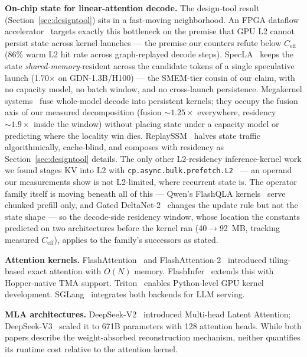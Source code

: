 \documentclass[10pt,twocolumn]{article}
\begin{document}
\textbf{On-chip state for linear-attention decode.}  The design-tool result (Section~\ref{sec:designtool}) sits in a fast-moving neighborhood.  An FPGA dataflow accelerator~\cite{gupta2026persistentstate} targets exactly this bottleneck on the premise that GPU L2 cannot persist state across kernel launches --- the premise our counters refute below $C_\text{eff}$ (86\% warm L2 hit rate across graph-replayed decode steps).  SpecLA~\cite{wang2026specla} keeps the state \emph{shared-memory}-resident across the candidate tokens of a single speculative launch (1.70$\times$ on GDN-1.3B/H100) --- the SMEM-tier cousin of our claim, with no capacity model, no batch window, and no cross-launch persistence.  Megakernel systems~\cite{automegakernel2026} fuse whole-model decode into persistent kernels; they occupy the fusion axis of our measured decomposition (fusion ${\sim}1.25\times$ everywhere, residency ${\sim}1.9\times$ inside the window) without placing state under a capacity model or predicting where the locality win dies.  ReplaySSM~\cite{dao2026replayssm} halves state traffic algorithmically, cache-blind, and composes with residency as Section~\ref{sec:designtool} details.  The only other L2-residency inference-kernel work we found stages KV into L2 with \texttt{cp.async.bulk.prefetch.L2}~\cite{kvprefetch2025} --- an operand our measurements show is not L2-limited, where recurrent state is.  The operator family itself is moving beneath all of this --- Qwen's FlashQLA kernels~\cite{flashqla2026} serve chunked prefill only, and Gated DeltaNet-2~\cite{nvidia2026gdn2} changes the update rule but not the state shape --- so the decode-side residency window, whose location the constants predicted on two architectures before the kernel ran (40${\to}$92~MB, tracking measured $C_\text{eff}$), applies to the family's successors as stated.

\textbf{Attention kernels.}  FlashAttention~\cite{flashattention} and FlashAttention-2~\cite{flashattention2} introduced tiling-based exact attention with $O(N)$ memory.  FlashInfer~\cite{flashinfer} extends this with Hopper-native TMA support.  Triton~\cite{triton} enables Python-level GPU kernel development.  SGLang~\cite{sglang} integrates both backends for LLM serving.

\textbf{MLA architectures.}  DeepSeek-V2~\cite{deepseekv2} introduced Multi-head Latent Attention; DeepSeek-V3~\cite{deepseekv3} scaled it to 671B parameters with 128 attention heads.  While both papers describe the weight-absorbed reconstruction mechanism, neither quantifies its runtime cost relative to the attention kernel.
\end{document}
